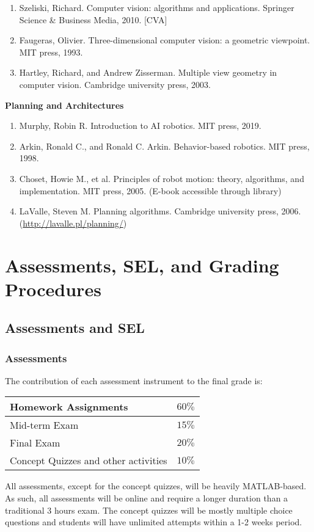\documentclass[a4paper,11pt]{article}
\begin{document}
\begin{itemize}
\begin{enumerate}[label=(\alph*)]
		\item Szeliski, Richard. Computer vision: algorithms and applications. Springer Science \& Business Media, 2010. [CVA]
	\item Faugeras, Olivier. Three-dimensional computer vision: a geometric viewpoint. MIT press, 1993.
	\item Hartley, Richard, and Andrew Zisserman. Multiple view geometry in computer vision. Cambridge university press, 2003.
\end{enumerate}
\textbf{Planning and Architectures}
\begin{enumerate}[label=(\alph*)]
	\item Murphy, Robin R. Introduction to AI robotics. MIT press, 2019.
	\item Arkin, Ronald C., and Ronald C. Arkin. Behavior-based robotics. MIT press, 1998.
	\item Choset, Howie M., et al. Principles of robot motion: theory, algorithms, and implementation. MIT press, 2005. (E-book accessible through library)
	\item LaValle, Steven M. Planning algorithms. Cambridge university press, 2006. (\url{http://lavalle.pl/planning/})
\end{enumerate}

\end{itemize}


\section{Assessments, SEL, and Grading Procedures}
\subsection{Assessments and SEL}
\subsubsection{Assessments}
The contribution of each assessment instrument to the final grade is:
\begin{center}
\begin{tabulary}{.5\textwidth}{|J|J|}
\hline
Homework Assignments & $60\%$\\\hline
Mid-term Exam & $15\%$\\\hline
Final Exam & $20\%$\\\hline
Concept Quizzes and other activities & $10\%$\\\hline
\end{tabulary}
\end{center}
All assessments, except for the concept quizzes, will be heavily MATLAB-based. As such, all assessments will be online and require a longer duration than a traditional 3 hours exam. The concept quizzes will be mostly multiple choice questions and students will have unlimited attempts within a 1-2 weeks period. 
\end{document}
